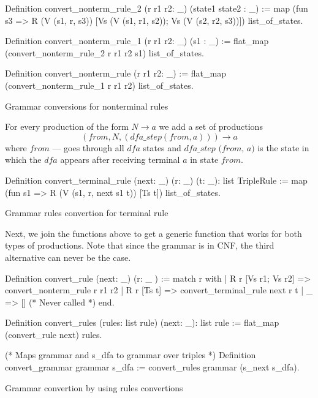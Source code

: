 \begin{listing}[h]
    \begin{pyglist}[language=coq, numbers=none, numbersep=5pt]
  Definition convert_nonterm_rule_2 
    (r r1 r2: _) 
    (state1 state2 : _) :=
    map (fun s3 => R (V (s1, r, s3)) 
                     [Vs (V (s1, r1, s2)); 
                      Vs (V (s2, r2, s3))])
      list_of_states.

  Definition convert_nonterm_rule_1  
               (r r1 r2: _) 
               (s1 : _) :=
    flat_map (convert_nonterm_rule_2 r r1 r2 s1) 
             list_of_states.

  Definition convert_nonterm_rule (r r1 r2: _) :=
    flat_map (convert_nonterm_rule_1 r r1 r2) 
             list_of_states.
    \end{pyglist}
    \caption{Grammar conversions for nonterminal rules}
    \label{lst:verbments1}
\end{listing}

For every production of the form $N \to a$ we add a set of productions $$(\textit{from}, N, (\textit{dfa\_step}(\textit{from}, a))) \to a$$ where $\textit{from}$ --- goes through all $\textit{dfa}$ states and $\textit{dfa\_step (from, a)}$ is the state in which the $\textit{dfa}$ appears after receiving terminal $a$ in state $\textit{from}$.

\begin{listing}[h]
    \begin{pyglist}[language=coq, numbers=none, numbersep=5pt]
  Definition convert_terminal_rule 
              (next: _) 
              (r: _) 
              (t: _): list TripleRule :=
    map (fun s1 => R (V (s1, r, next s1 t)) 
	               [Ts t]) 
        list_of_states.
    \end{pyglist}
    \caption{Grammar rules convertion for terminal rule}
    \label{lst:verbments1}
\end{listing}

Next, we join the functions above to get a generic function that works for both types of productions. 
Note that since the grammar is in CNF, the third alternative can never be the case.

\begin{listing}[h]
    \begin{pyglist}[language=coq, numbers=none, numbersep=5pt]
  Definition convert_rule (next: _) (r: _ ) :=
    match r with
    | R r [Vs r1; Vs r2] => 
        convert_nonterm_rule r r1 r2
    | R r [Ts t] => 
        convert_terminal_rule next r t 
    | _  => []   (* Never called *)
    end.
        
  Definition convert_rules 
    (rules: list rule) (next: _): list rule :=
    flat_map (convert_rule next) rules.
    
  (* Maps grammar and s_dfa 
     to grammar over triples *)
  Definition convert_grammar grammar s_dfa :=
    convert_rules grammar (s_next s_dfa). 
    \end{pyglist}
    \caption{Grammar convertion by using rules convertions}
    \label{lst:verbments1}
\end{listing}

